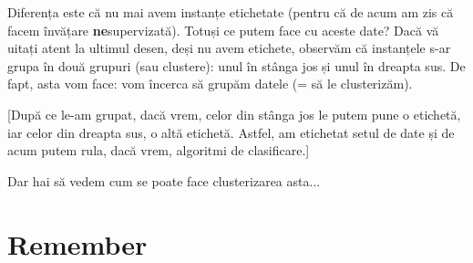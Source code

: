 \documentclass[12pt]{article}
\begin{document}
	Diferența este că nu mai avem instanțe etichetate (pentru că de acum am zis că facem învățare \textbf{ne}supervizată). Totuși ce putem face cu aceste date? Dacă vă uitați atent la ultimul desen, deși nu avem etichete, observăm că instanțele s-ar grupa în două grupuri (sau clustere): unul în stânga jos și unul în dreapta sus. De fapt, asta vom face: vom încerca să grupăm datele (= să le clusterizăm). 
	
	[După ce le-am grupat, dacă vrem, celor din stânga jos le putem pune o etichetă, iar celor din dreapta sus, o altă etichetă. Astfel, am etichetat setul de date și de acum putem rula, dacă vrem, algoritmi de clasificare.] 
	
	Dar hai să vedem cum se poate face clusterizarea asta...

	\section{Remember}
\end{document}
